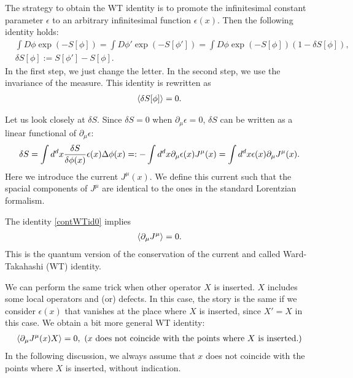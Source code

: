\documentclass[12pt]{scrartcl}
\newcommand{\del}{\partial}
\begin{document}
The strategy to obtain the WT identity is to promote the infinitesimal constant parameter $\epsilon$ to an arbitrary infinitesimal function $\epsilon(x)$.  Then the following identity holds:
\begin{align}
    &\int D\phi \exp(-S[\phi])=
    \int D\phi' \exp(-S[\phi'])=
    \int D\phi \exp(-S[\phi]) (1-\delta S[\phi]),\\
    &\delta S[\phi]:=S[\phi']-S[\phi].
\end{align}
In the first step, we just change the letter.  In the second step, we use the invariance of the measure.
This identity is rewritten as
\begin{align}
    \expval{\delta S[\phi]}=0.
    \label{contWTid0}
\end{align}

Let us look closely at $\delta S$.  Since $\delta S=0$ when $\del_{\mu}\epsilon=0$,  $\delta S$ can be written as a linear functional of $\del_{\mu}\epsilon$:
\begin{align}
    \delta S=\int d^dx \fdv{S}{\phi(x)}\epsilon(x)\Delta\phi(x)
    =:-\int d^d x\del_{\mu}\epsilon(x) J^{\mu}(x)=
    \int d^dx \epsilon(x)\del_{\mu}J^{\mu}(x).\label{defcurrent}
\end{align}
Here we introduce the current $J^{\mu}(x)$.  We define this current such that the spacial components of $J^{\mu}$ are identical to the ones in the standard Lorentzian formalism.

The identity \eqref{contWTid0} implies
\begin{align}
    \expval{\del_{\mu}J^{\mu}}=0.
\end{align}
This is the quantum version of the conservation of the current and called Ward-Takahashi (WT) identity.

We can perform the same trick when other operator $X$ is inserted.  $X$ includes some local operators and (or) defects.  In this case, the story is the same if we consider $\epsilon(x)$ that vanishes at the place where $X$ is inserted, since $X'=X$ in this case.  We obtain a bit more general WT identity:
\begin{align}
    \expval{\del_{\mu}J^{\mu}(x) X}=0,\ (x \text{ does not coincide with the points where $X$ is inserted.})
    \label{WTid0.5}
\end{align}
In the following discussion, we always assume that $x$ does not coincide with the points where $X$ is inserted, without indication.
\end{document}
